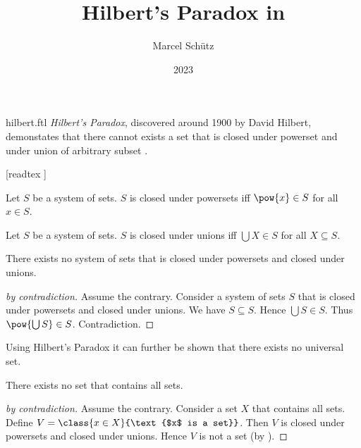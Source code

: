\documentclass{stex}
\begin{document}
\title{Hilbert's Paradox in \Naproche}
\author{Marcel Schütz}
\date{2023}
\maketitle
\begin{smodule}{hilbert.ftl}
  \noindent \emph{Hilbert's Paradox}, discovered around 1900 by David Hilbert, demonstates that there cannot exists a set that is closed under powerset and under union of arbitrary subset \cite{PeckhausKahl2002}.

  \begin{forthel}
    [readtex ]
  \end{forthel}

  \begin{forthel}
    \begin{definition*}
      Let $S$ be a system of sets.
      $S$ is closed under powersets iff $\pow{x} \in S$ for all $x \in S$.
    \end{definition*}

    \begin{definition*}
      Let $S$ be a system of sets.
      $S$ is closed under unions iff $\bigcup X \in S$ for all $X \subseteq S$.
    \end{definition*}

    \begin{theorem*}\label{hilbert_paradox}
      There exists no system of sets that is closed under powersets and closed under unions.
    \end{theorem*}
    \begin{proof}[ by contradiction]
      Assume the contrary.
      Consider a system of sets $S$ that is closed under powersets and closed under unions.
      We have $S \subseteq S$.
      Hence $\bigcup S \in S$.
      Thus $\pow{\bigcup S} \in S$.
      Contradiction.
    \end{proof}
  \end{forthel}

  \noindent Using Hilbert's Paradox it can further be shown that there exists no universal set.

  \begin{forthel}
    \begin{corollary*}
      There exists no set that contains all sets.
    \end{corollary*}
    \begin{proof}[ by contradiction]
      Assume the contrary.
      Consider a set $X$ that contains all sets.
      Define $V = \class{x \in X}{\text{$x$ is a set}}$.
      Then $V$ is closed under powersets and closed under unions.
      Hence $V$ is not a set (by ).
    \end{proof}
  \end{forthel}
\end{smodule}
\printbibliography
\end{document}
